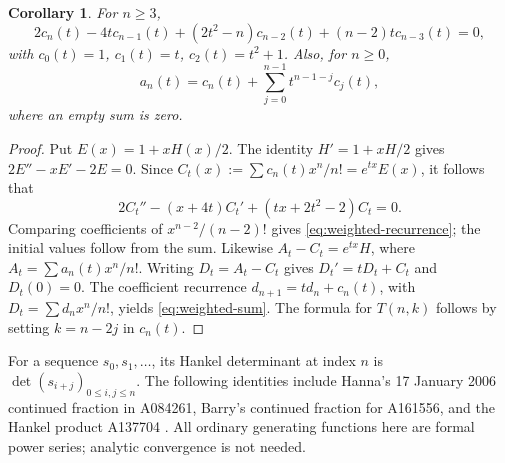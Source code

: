 \documentclass[11pt]{article}
\newtheorem{corollary}{Corollary}
\begin{document}
\begin{corollary}\label{cor:weighted}
For $n\geq3$,
\begin{equation}\label{eq:weighted-recurrence}
 2c_n(t)-4t c_{n-1}(t)+(2t^2-n)c_{n-2}(t)
       +(n-2)t c_{n-3}(t)=0,
\end{equation}
with $c_0(t)=1$, $c_1(t)=t$, $c_2(t)=t^2+1$. Also, for $n\geq0$,
\begin{equation}\label{eq:weighted-sum}
 a_n(t)=c_n(t)+\sum_{j=0}^{n-1}t^{n-1-j}c_j(t),
\end{equation}
where an empty sum is zero.
\end{corollary}
\begin{proof}
Put $E(x)=1+xH(x)/2$. The identity $H'=1+xH/2$ gives
$2E''-xE'-2E=0$. Since
$C_t(x):=\sum c_n(t)x^n/n!=e^{tx}E(x)$, it follows that
\[
 2C_t''-(x+4t)C_t'+(tx+2t^2-2)C_t=0.
\]
Comparing coefficients of $x^{n-2}/(n-2)!$ gives
\eqref{eq:weighted-recurrence}; the initial values follow from the sum.
Likewise $A_t-C_t=e^{tx}H$, where $A_t=\sum a_n(t)x^n/n!$.
Writing $D_t=A_t-C_t$ gives $D_t'=tD_t+C_t$ and $D_t(0)=0$.
The coefficient recurrence $d_{n+1}=td_n+c_n(t)$, with
$D_t=\sum d_nx^n/n!$, yields \eqref{eq:weighted-sum}.
The formula for $T(n,k)$ follows by setting $k=n-2j$ in $c_n(t)$.
\end{proof}

For a sequence $s_0,s_1,\ldots$, its Hankel determinant at index $n$ is
$\det(s_{i+j})_{0\leq i,j\leq n}$.
The following identities include Hanna's 17 January 2006 continued
fraction in A084261, Barry's continued fraction for A161556, and the
Hankel product A137704 \cite{oeis-c,oeis-triangle,oeis-hankel}.
All ordinary generating functions here are formal power series;
analytic convergence is not needed.
\end{document}
